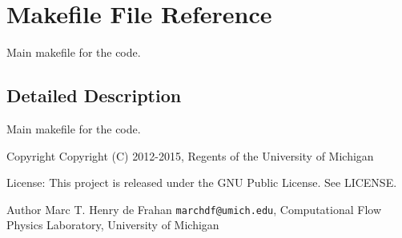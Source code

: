 \section{Makefile File Reference}
\label{Makefile}


Main makefile for the code.  




\subsection{Detailed Description}
Main makefile for the code. \begin{DoxyCopyright}{Copyright}
Copyright (C) 2012-\/2015, Regents of the University of Michigan 
\end{DoxyCopyright}
\begin{DoxyParagraph}{License\-:}
This project is released under the G\-N\-U Public License. See L\-I\-C\-E\-N\-S\-E. 
\end{DoxyParagraph}
\begin{DoxyAuthor}{Author}
Marc T. Henry de Frahan {\tt marchdf@umich.\-edu}, Computational Flow Physics Laboratory, University of Michigan
\end{DoxyAuthor}

